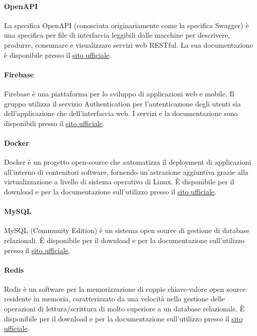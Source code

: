 \paragraph{OpenAPI}\hbox{}
La specifica OpenAPI (conosciuta originariamente come la specifica Swagger) è una specifica per file di interfaccia leggibili dalle macchine per descrivere, produrre, consumare e visualizzare servizi web RESTful.
La sua documentazione è disponibile presso il \href{https://www.openapis.org/}{sito ufficiale}. 

\paragraph{Firebase}\hbox{}
Firebase è una piattaforma per lo sviluppo di applicazioni web e mobile. Il gruppo utilizza il servizio Authentication per l'autenticazione degli utenti sia dell'applicazione che dell'interfaccia web.
I servizi e la documentazione sono disponibili presso il \href{https://firebase.google.com/?hl=it}{sito ufficiale}.

\paragraph{Docker}\hbox{}
Docker è un progetto open-source che automatizza il deployment di applicazioni all'interno di contenitori software, fornendo un'astrazione aggiuntiva grazie alla virtualizzazione a livello di sistema operativo di Linux.
È disponibile per il download e per la documentazione sull'utilizzo presso il \href{https://www.docker.com/}{sito ufficiale}.

\paragraph{MySQL}\hbox{}
MySQL (Community Edition) è un sistema open source di gestione di database relazionali.
È disponibile per il download e per la documentazione sull'utilizzo presso il \href{https://www.mysql.com/it/}{sito ufficiale}.

\paragraph{Redis}\hbox{}
Redis è un software per la memorizzazione di coppie chiave-valore open source residente in memoria, caratterizzato da una velocità nella gestione delle operazioni di lettura/scrittura di molto superiore a un database relazionale.
È disponibile per il download e per la documentazione sull'utilizzo presso il \href{https://redis.io/}{sito ufficiale}.


